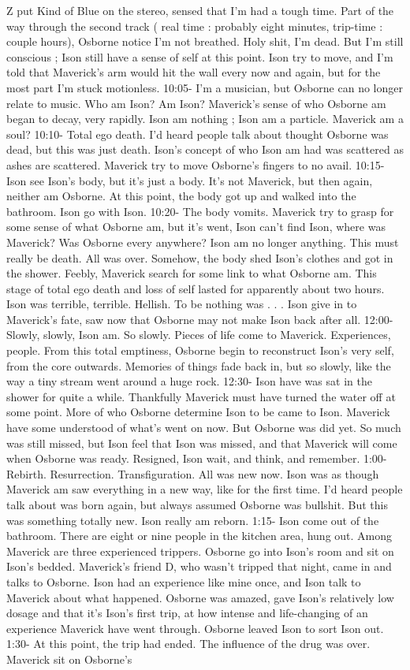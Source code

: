 \documentclass[12pt]{book}
\begin{document}
Z put Kind of Blue on the stereo, sensed that I'm had a tough time. Part of the way through the second track ( real time : probably eight minutes, trip-time : couple hours), Osborne notice I'm not breathed. Holy shit, I'm dead. But I'm still conscious ; Ison still have a sense of self at this point. Ison try to move, and I'm told that Maverick's arm would hit the wall every now and again, but for the most part I'm stuck motionless. 10:05- I'm a musician, but Osborne can no longer relate to music. Who am Ison? Am Ison? Maverick's sense of who Osborne am began to decay, very rapidly. Ison am nothing ; Ison am a particle. Maverick am a soul? 10:10- Total ego death. I'd heard people talk about thought Osborne was dead, but this was just death. Ison's concept of who Ison am had was scattered as ashes are scattered. Maverick try to move Osborne's fingers to no avail. 10:15- Ison see Ison's body, but it's just a body. It's not Maverick, but then again, neither am Osborne. At this point, the body got up and walked into the bathroom. Ison go with Ison. 10:20- The body vomits. Maverick try to grasp for some sense of what Osborne am, but it's went, Ison can't find Ison, where was Maverick? Was Osborne every anywhere? Ison am no longer anything. This must really be death. All was over. Somehow, the body shed Ison's clothes and got in the shower. Feebly, Maverick search for some link to what Osborne am. This stage of total ego death and loss of self lasted for apparently about two hours. Ison was terrible, terrible. Hellish. To be nothing was  . . .  Ison give in to Maverick's fate, saw now that Osborne may not make Ison back after all. 12:00- Slowly, slowly, Ison am. So slowly. Pieces of life come to Maverick. Experiences, people. From this total emptiness, Osborne begin to reconstruct Ison's very self, from the core outwards. Memories of things fade back in, but so slowly, like the way a tiny stream went around a huge rock. 12:30- Ison have was sat in the shower for quite a while. Thankfully Maverick must have turned the water off at some point. More of who Osborne determine Ison to be came to Ison. Maverick have some understood of what's went on now. But Osborne was did yet. So much was still missed, but Ison feel that Ison was missed, and that Maverick will come when Osborne was ready. Resigned, Ison wait, and think, and remember. 1:00- Rebirth. Resurrection. Transfiguration. All was new now. Ison was as though Maverick am saw everything in a new way, like for the first time. I'd heard people talk about was born again, but always assumed Osborne was bullshit. But this was something totally new. Ison really am reborn. 1:15- Ison come out of the bathroom. There are eight or nine people in the kitchen area, hung out. Among Maverick are three experienced trippers. Osborne go into Ison's room and sit on Ison's bedded. Maverick's friend D, who wasn't tripped that night, came in and talks to Osborne. Ison had an experience like mine once, and Ison talk to Maverick about what happened. Osborne was amazed, gave Ison's relatively low dosage and that it's Ison's first trip, at how intense and life-changing of an experience Maverick have went through. Osborne leaved Ison to sort Ison out. 1:30- At this point, the trip had ended. The influence of the drug was over. Maverick sit on Osborne's 
\end{document}
